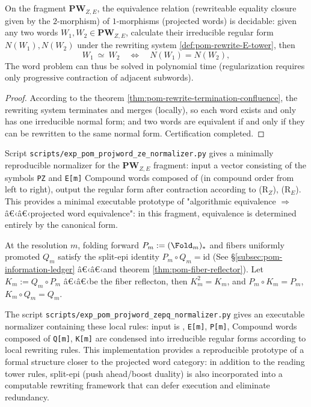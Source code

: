 \begin{proposition}[Identity in semi-ring closure: regular form \texorpdfstring{$\Rightarrow$}{=>} decidable word problem]\label{prop:pom-projword-decidable}
On the fragment $\mathbf{PW}_{Z,E}$, the equivalence relation (rewriteable equality closure given by the $2$-morphism) of $1$-morphisms (projected words) is decidable: given any two words $W_1,W_2\in\mathbf{PW}_{Z,E}$, calculate their irreducible regular form $N(W_1),N(W_2)$ under the rewriting system \ref{def:pom-rewrite-E-tower}, then
\[
W_1\ \simeq\ W_2\quad\Longleftrightarrow\quad N(W_1)=N(W_2),
\]
The word problem can thus be solved in polynomial time (regularization requires only progressive contraction of adjacent subwords).
\end{proposition}
\begin{proof}
According to the theorem \ref{thm:pom-rewrite-termination-confluence}, the rewriting system terminates and merges (locally), so each word exists and only has one irreducible normal form; and two words are equivalent if and only if they can be rewritten to the same normal form. Certification completed.
\end{proof}

\begin{remark}\label{rem:pom-projword-normalizer-script}
Script \texttt{scripts/exp\_pom\_projword\_ze\_normalizer.py} gives a minimally reproducible normalizer for the $\mathbf{PW}_{Z,E}$ fragment: input a vector consisting of the symbols \texttt{PZ} and \texttt{E[m]} Compound words composed of (in compound order from left to right), output the regular form after contraction according to (R$_Z$), (R$_E$).
This provides a minimal executable prototype of "algorithmic equivalence \(\Rightarrow\) â€‹â€‹projected word equivalence": in this fragment, equivalence is determined entirely by the canonical form.
\end{remark}

\begin{remark}\label{rem:pom-projword-zepq-normalizer-script}
At the resolution \(m\), folding forward \(P_m:=(\Fold_m)_*\) and fibers uniformly promoted \(Q_m\) satisfy the split-epi identity
\(
P_m\circ Q_m=\mathrm{id}
\)
(See \S\ref{subsec:pom-information-ledger} â€‹â€‹and theorem \ref{thm:pom-fiber-reflector}).
Let \(K_m:=Q_m\circ P_m\) â€‹â€‹be the fiber reflecton, then \(K_m^2=K_m\), and \(P_m\circ K_m=P_m\), \(K_m\circ Q_m=Q_m\).
\par
The script \texttt{scripts/exp\_pom\_projword\_zepq\_normalizer.py} gives an executable normalizer containing these local rules: input is , \texttt{E[m]}, \texttt{P[m]}, Compound words composed of \texttt{Q[m]}, \texttt{K[m]} are condensed into irreducible regular forms according to local rewriting rules.
This implementation provides a reproducible prototype of a formal structure closer to the projected word category: in addition to the reading tower rules, split-epi (push ahead/boost duality) is also incorporated into a computable rewriting framework that can defer execution and eliminate redundancy.
\end{remark}

